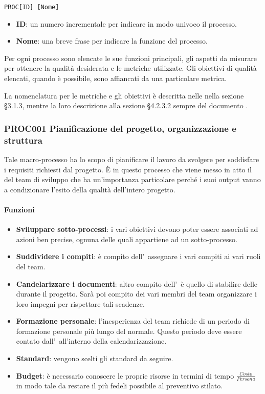 \begin{center}
	\texttt{PROC[ID] [Nome]}
\end{center}

\begin{itemize}
	\item \textbf{ID}: un numero incrementale per indicare in modo univoco il processo.
	\item \textbf{Nome}: una breve frase per indicare la funzione del processo.
\end{itemize}

Per ogni processo sono elencate le sue funzioni principali, gli aspetti da misurare per ottenere la qualità desiderata e le metriche utilizzate. Gli obiettivi di qualità elencati, quando è possibile, sono affiancati da una particolare metrica. 

La nomenclatura per le metriche e gli obiettivi è descritta nelle \NdPv nella sezione §3.1.3, mentre la loro descrizione alla sezione §4.2.3.2 sempre del documento \NdPv.

	\subsubsection{PROC001 Pianificazione del progetto, organizzazione e struttura}
	Tale macro-processo ha lo scopo di pianificare il lavoro da svolgere per soddisfare i requisiti richiesti dal progetto. È in questo processo che viene messo in atto il  del team di sviluppo che ha un'importanza particolare perché i suoi output vanno a condizionare l'esito della qualità dell'intero progetto.
	
		\paragraph*{Funzioni}
	
		\begin{itemize}
			\item \textbf{Sviluppare sotto-processi}: i vari obiettivi devono poter essere associati ad azioni ben precise, ognuna delle quali appartiene ad un sotto-processo.
			\item \textbf{Suddividere i compiti}: è compito dell'\Amm\ assegnare i vari compiti ai vari ruoli del team.
			\item \textbf{Candelarizzare i documenti}: altro compito dell'\Amm\ è quello di stabilire delle  durante il progetto. Sarà poi compito dei vari membri del team organizzare i loro impegni per rispettare tali scadenze.
			\item \textbf{Formazione personale}: l'inesperienza del team richiede di un periodo di formazione personale più lungo del normale. Questo periodo deve essere contato dall'\Amm\ all'interno della calendarizzazione.
			\item \textbf{Standard}: vengono scelti gli standard da seguire.
			\item \textbf{Budget}: è necessario conoscere le proprie risorse in termini di tempo $\frac{Costo}{Persona}$ in modo tale da restare il più fedeli possibile al preventivo stilato.
		\end{itemize}
	
